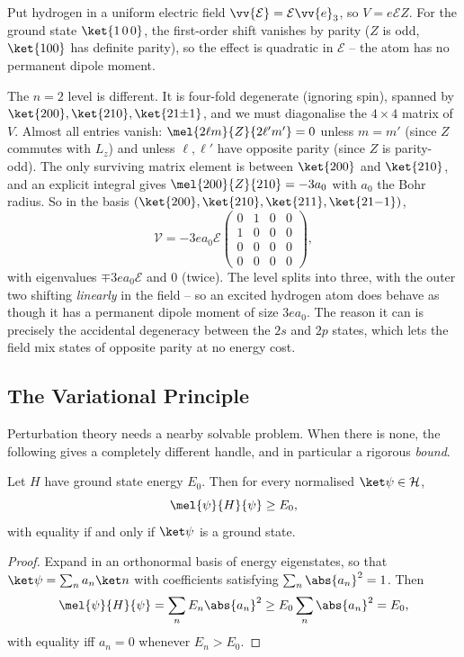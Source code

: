 \begin{example}
    Put hydrogen in a uniform electric field $\vv{\mathcal{E}} = \mathcal{E}\vv{e}_3$, so $V = e\mathcal{E}Z$. For the ground state $\ket{1\,0\,0}$, the first-order shift vanishes by parity ($Z$ is odd, $\ket{100}$ has definite parity), so the effect is quadratic in $\mathcal{E}$ -- the atom has no permanent dipole moment.

    The $n=2$ level is different. It is four-fold degenerate (ignoring spin), spanned by $\ket{200}, \ket{210},\ket{21{\pm}1}$, and we must diagonalise the $4\times4$ matrix of $V$. Almost all entries vanish: $\mel{2\ell m}{Z}{2\ell'm'} = 0$ unless $m = m'$ (since $Z$ commutes with $L_z$) and unless $\ell,\ell'$ have opposite parity (since $Z$ is parity-odd). The only surviving matrix element is between $\ket{200}$ and $\ket{210}$, and an explicit integral gives $\mel{200}{Z}{210} = -3a_0$ with $a_0$ the Bohr radius. So in the basis $(\ket{200},\ket{210},\ket{211},\ket{21{-}1})$,
    $$
    \mathcal{V} = -3ea_0\mathcal{E}\begin{pmatrix}0&1&0&0\\1&0&0&0\\0&0&0&0\\0&0&0&0\end{pmatrix},
    $$
    with eigenvalues $\mp3ea_0\mathcal{E}$ and $0$ (twice). The level splits into three, with the outer two shifting \emph{linearly} in the field -- so an excited hydrogen atom does behave as though it has a permanent dipole moment of size $3ea_0$. The reason it can is precisely the accidental degeneracy between the $2s$ and $2p$ states, which lets the field mix states of opposite parity at no energy cost.
\end{example}

\subsection{The Variational Principle}

Perturbation theory needs a nearby solvable problem. When there is none, the following gives a completely different handle, and in particular a rigorous \emph{bound}.

\begin{theorem}
    Let $H$ have ground state energy $E_0$. Then for every normalised $\ket\psi \in \mathcal{H}$,
    $$
    \mel{\psi}{H}{\psi} \geq E_0,
    $$
    with equality if and only if $\ket\psi$ is a ground state.
\end{theorem}
\begin{proof}
    Expand in an orthonormal basis of energy eigenstates, so that $\ket\psi = \sum_n a_n \ket n$ with coefficients satisfying $\sum_n \abs{a_n}^2 = 1$. Then
    $$
    \mel{\psi}{H}{\psi} = \sum_n E_n \abs{a_n}^2 \geq E_0 \sum_n \abs{a_n}^2 = E_0,
    $$
    with equality iff $a_n = 0$ whenever $E_n > E_0$.
\end{proof}

